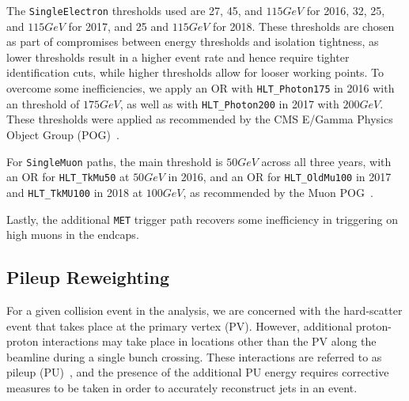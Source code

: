 %  

The \texttt{SingleElectron} \pt thresholds used are 27, 45, and $115\unit{GeV}$ for 2016, 32, 25, and $115\unit{GeV}$ for 2017, and 25 and $115\unit{GeV}$ for 2018.
These thresholds are chosen as part of compromises between energy thresholds and isolation tightness, as lower \pt thresholds result in a higher event rate and hence require tighter identification cuts, while higher \pt thresholds allow for looser working points.
To overcome some inefficiencies, we apply an OR with \texttt{HLT\_Photon175} in 2016 with an \Et threshold of $175\unit{GeV}$, as well as with \texttt{HLT\_Photon200} in 2017 with $200\unit{GeV}$. %
These thresholds were applied as recommended by the CMS E/Gamma Physics Object Group (POG)~\cite{MuonPOG}.

For \texttt{SingleMuon} paths, the main threshold is $50\unit{GeV}$ across all three years, with an OR for \texttt{HLT\_TkMu50} at $50\unit{GeV}$ in 2016, and an OR for \texttt{HLT\_OldMu100} in 2017 and \texttt{HLT\_TkMU100} in 2018 at $100\unit{GeV}$, as recommended by the Muon POG~\cite{MuonHLT_16,MuonHLT_17,MuonHLT_18}.

Lastly, the additional \texttt{MET} trigger path recovers some inefficiency in triggering on high \pt muons in the endcaps.


\subsection{Pileup Reweighting}

For a given collision event in the analysis, we are concerned with the hard-scatter event that takes place at the primary vertex (PV).
However, additional proton-proton interactions may take place in locations other than the PV along the beamline during a single bunch crossing.
These interactions are referred to as pileup (PU)~\cite{Perloff_2012}, and the presence of the additional PU energy requires corrective measures to be taken in order to accurately reconstruct jets in an event.

